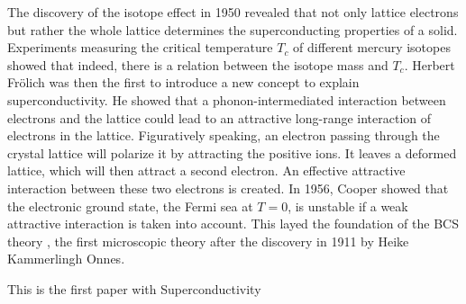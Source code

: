The discovery of the isotope effect in 1950 revealed that not only lattice electrons but rather the whole lattice determines the superconducting properties of a solid. Experiments measuring the critical temperature $T_c$ of different mercury isotopes showed that indeed, there is a relation between the isotope mass and $T_c$. Herbert Fr\"olich was then the first to introduce a new concept to explain superconductivity. He showed that a phonon-intermediated interaction between electrons and the lattice could lead to an attractive long-range interaction of electrons in the lattice. Figuratively speaking, an electron passing through the crystal lattice will polarize it by attracting the positive ions. It leaves a deformed lattice, which will then attract a second electron. An effective attractive interaction between these two electrons is created. %
In 1956, Cooper showed that the electronic ground state, the Fermi sea at $T = 0$, is unstable if a weak attractive interaction is taken into account. This layed the foundation of the BCS theory \cite{Bardeen1957}, the first microscopic theory after the discovery in 1911 by Heike Kammerlingh Onnes. 
 

This is the first paper with Superconductivity 

